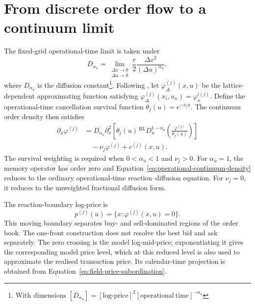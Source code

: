 \documentclass[5p,final]{elsarticle}
\begin{document}
\section{From discrete order flow to a continuum limit}
The fixed-grid operational-time limit is taken under
\begin{equation}\label{eq:d}
    D_{\alpha_u}
    =\lim_{\substack{\Delta x\to0\\\Delta u\to0}}
    \frac{r}{2}\frac{\Delta x^2}{(\Delta u)^{\alpha_u}},
\end{equation}
where $D_{\alpha_u}$ is the diffusion constant\footnote{With dimensions $[D_{\alpha_u}]=[\mathrm{log\text{-}price}]^2[\mathrm{operational\ time}]^{-\alpha_u}$}. Following \citet{angstmann2016,angstmann2019advection}, let $\varphi_\Delta^{(j)}(x,u)$ be the lattice-dependent approximating function satisfying $\varphi_\Delta^{(j)}(x_i,u_n)=\varphi_n^{i(j)}$. Define the operational-time cancellation survival function $\theta_j(u)=e^{-\nu_ju}$. The continuum order density then satisfies
\begin{equation}
\begin{aligned}
\partial_u \varphi^{(j)}
&= D_{\alpha_u}\partial_x^2\left[
\theta_j(u)\,{}^{\mathrm{RL}}D_u^{1-\alpha_u}
\left(\frac{\varphi^{(j)}}{\theta_j(u)}\right)
\right]\\
&\quad-\nu_j\varphi^{(j)}+c^{(j)}(x,u).
\end{aligned}
\label{eq:operational-continuum-density}
\end{equation}
The survival weighting is required when $0<\alpha_u<1$ and $\nu_j>0$. For $\alpha_u=1$, the memory operator has order zero and Equation~\eqref{eq:operational-continuum-density} reduces to the ordinary operational-time reaction--diffusion equation. For $\nu_j=0$, it reduces to the unweighted fractional diffusion form.

The reaction-boundary log-price is
\begin{equation}
    p^{(j)}(u)=\{x:\varphi^{(j)}(x,u)=0\}.
\end{equation}
This moving boundary separates buy- and sell-dominated regions of the order book. The one-front construction does not resolve the best bid and ask separately. The zero crossing is the model log-mid-price; exponentiating it gives the corresponding model price level, which at this reduced level is also used to approximate the realised transaction price. Its calendar-time projection is obtained from Equation~\eqref{eq:field-price-subordination}.
\end{document}
